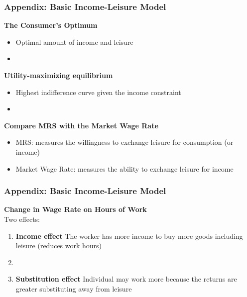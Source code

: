 \documentclass[blue]{beamer}
\begin{document}
 \begin{frame} \frametitle{Appendix: Basic Income-Leisure Model}
\textbf{The Consumer's Optimum}\\

\begin{itemize}
\item Optimal amount of income and leisure
\item[]
 \end{itemize}
 
\textbf{Utility-maximizing equilibrium}\\
\begin{itemize}
 \item  Highest indifference curve given the income constraint
 \item[]
 \end{itemize}
 
\textbf{Compare MRS with the Market Wage Rate}

 \begin{itemize}
  \item MRS: measures the willingness to exchange leisure for consumption (or income)
 
  \item Market Wage Rate: measures the ability to exchange leisure for income
\end{itemize}
 \end{frame}





 \begin{frame} \frametitle{Appendix: Basic Income-Leisure Model}
\textbf{Change in Wage Rate on Hours of Work}\\


Two effects:
\begin{enumerate}
\item\textbf{ Income effect} The worker has more income to buy more goods including leisure (reduces work hours)
\item[]
\item \textbf{Substitution effect} Individual may work more because the returns are greater substituting away from leisure
\end{enumerate}

 \end{frame}
\end{document}
